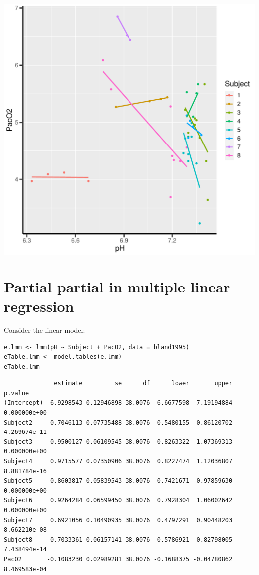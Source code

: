 \documentclass[12pt]{article}
\begin{document}
\begin{center}
\includegraphics[trim={0 0 0 0},width=1\textwidth]{./figures/gg-describe-dataset.pdf}
\end{center}


\clearpage

\section{Partial partial in multiple linear regression}
\label{sec:org235ae36}

Consider the linear model:
\lstset{language=r,label= ,caption= ,captionpos=b,numbers=none}
\begin{lstlisting}
e.lmm <- lmm(pH ~ Subject + PacO2, data = bland1995)
eTable.lmm <- model.tables(e.lmm)
eTable.lmm
\end{lstlisting}

\begin{verbatim}
              estimate         se      df      lower       upper      p.value
(Intercept)  6.9298543 0.12946898 38.0076  6.6677598  7.19194884 0.000000e+00
Subject2     0.7046113 0.07735488 38.0076  0.5480155  0.86120702 4.269674e-11
Subject3     0.9500127 0.06109545 38.0076  0.8263322  1.07369313 0.000000e+00
Subject4     0.9715577 0.07350906 38.0076  0.8227474  1.12036807 8.881784e-16
Subject5     0.8603817 0.05839543 38.0076  0.7421671  0.97859630 0.000000e+00
Subject6     0.9264284 0.06599450 38.0076  0.7928304  1.06002642 0.000000e+00
Subject7     0.6921056 0.10490935 38.0076  0.4797291  0.90448203 8.662210e-08
Subject8     0.7033361 0.06157141 38.0076  0.5786921  0.82798005 7.438494e-14
PacO2       -0.1083230 0.02989281 38.0076 -0.1688375 -0.04780862 8.469583e-04
\end{verbatim}
\end{document}
